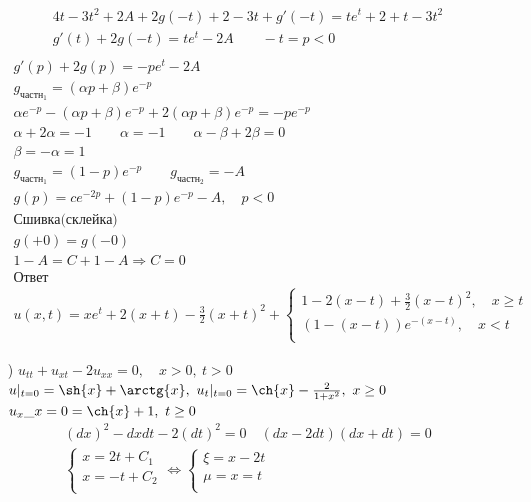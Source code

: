 \begin{enumerate}
\begin{gather*}
\begin{split}
\end{split} \\
4t-3t^{2}+2A+2g(-t)+2-3t+g'(-t) = te^{t}+2+t-3t^{2} \\
g'(t)+2g(-t)=te^{t}-2A \qquad -t = p < 0 \\
\end{gather*}
\begin{gather*}
g'(p)+2g(p)=-pe^{t}-2A \\
  g_{\text{частн}_{1}} = (\alpha p + \beta ) e^{-p} \\
  \alpha e^{-p}- (\alpha p +\beta)e^{-p}+2(\alpha p + \beta)e^{-p} = -pe^{-p} \\
  \alpha +2\alpha = -1 \qquad \alpha = -1 \qquad \alpha - \beta +2 \beta = 0 \\
  \beta = -\alpha = 1 \\
  g_{\text{частн}_{1}} = (1-p)e^{-p} \qquad g_{\text{частн}_{2}}=-A \\
  g(p) = ce^{-2p}+(1-p)e^{-p}-A, \quad p < 0 \\
  \text{Сшивка(склейка)} \\
  g(+0)= g(-0) \\
  1-A=C+1-A \Rightarrow C = 0 \\
  \text{Ответ} \\
  \boxed{u(x,t)=xe^{t}+2(x+t)- \frac{3}{2}(x+t)^{2} +
  \begin{cases}
   1-2(x-t) + \frac{3}{2}(x-t)^{2}, \quad x \geq t \\
   (1-(x-t))e^{-(x-t)}, \quad x <t \\
\end{cases}}
\end{gather*}
\item[\text{г})] $u_{tt}+u_{xt}-2u_{xx}=0, \quad x >0, \ t>0$ \\
  $u|_{t=0}=\sh{x}+\arctg{x}, \ u_{t}|_{t=0}= \ch{x}- \frac{2}{1+x^{2}}, \ x \geq 0$ \\
  $u_{x}\_{x=0}=\ch{x}+1, \ t \geq 0$ \\
  \begin{gather*}
    (dx)^{2}-dxdt-2(dt)^{2}=0 \quad (dx-2dt)(dx+dt) = 0 \\
    \begin{cases}
     x = 2t + C_{1} \\ x = -t + C_{2} \\
    \end{cases} \Leftrightarrow
    \begin{cases}
     \xi = x-2t \\ \mu = x=t \\ 

\end{cases}
\end{gather*}
\end{enumerate}
